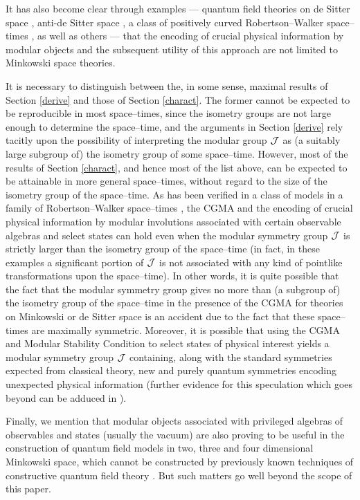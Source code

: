\documentclass[12pt]{article}
\def\Js{{\cal J}}
\begin{document}
     It has also become clear through examples --- quantum field
theories on de Sitter space \cite{BoBu,BDFS,Flodiss}, anti-de Sitter space
\cite{BFS1,BSads}, a class of positively curved Robertson--Walker
space--times \cite{BMS1,BMS2}, as well as others \cite{SuVe,Str} --- that
the encoding of crucial physical information by modular objects and
the subsequent utility of this approach are not limited to Minkowski space
theories.

     It is necessary to distinguish between the, in some sense,
maximal results of Section \ref{derive} and those of Section
\ref{charact}. The former cannot be expected to be reproducible in
most space--times, since the isometry groups are not large enough to
determine the space--time, and the arguments in Section \ref{derive}
rely tacitly upon the possibility of interpreting the modular group
$\Js$ as (a suitably large subgroup of) the isometry group of some
space--time.  However, most of the results of Section \ref{charact},
and hence most of the list above, can be expected to be attainable in
more general space--times, without regard to the size of the isometry
group of the space--time. As has been verified in a class of models in
a family of Robertson--Walker space--times \cite{BMS1}, the CGMA and
the encoding of crucial physical information by modular involutions
associated with certain observable algebras and select states can hold
even when the modular symmetry group $\Js$ is strictly larger than the
isometry group of the space--time (in fact, in these examples a
significant portion of $\Js$ is not associated with any kind of
pointlike transformations upon the space--time).  In other words, it
is quite possible that the fact that the modular symmetry group gives
no more than (a subgroup of) the isometry group of the space--time in
the presence of the CGMA for theories on Minkowski or de Sitter space
is an accident due to the fact that these space--times are maximally
symmetric. Moreover, it is possible that using the CGMA and Modular
Stability Condition to select states of physical interest yields a
modular symmetry group $\Js$ containing, along with the standard
symmetries expected from classical theory, new and purely quantum
symmetries encoding unexpected physical information (further evidence
for this speculation which goes beyond \cite{BMS1} can be adduced in
\cite{FaSch}).

     Finally, we mention that modular objects associated with
privileged algebras of observables and states (usually the vacuum) are
also proving to be useful in the construction of quantum field models
in two, three and four dimensional Minkowski space, which cannot be
constructed by previously known techniques of constructive quantum
field theory \cite{BrGuLo3,Sch2,BuLe,MuSchYng,BuSu2,Le3,GrLe,BS6}. But
such matters go well beyond the scope of this paper.
\end{document}
